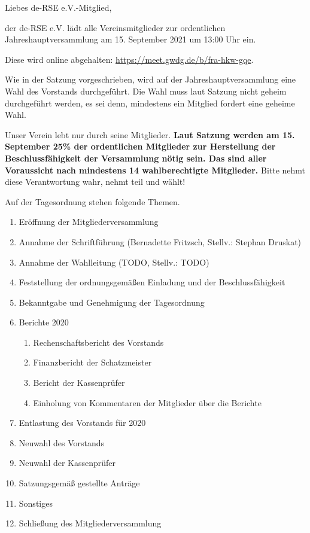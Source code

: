 \documentclass[../Vorlagen/de-RSE_Brief,a4paper]{scrlttr2}
\begin{document}

\begin{letter}{\mbox{}
}
\opening{Liebes de-RSE e.V.-Mitglied,}

der de-RSE e.V. lädt alle Vereinsmitglieder zur ordentlichen Jahreshauptversammlung am 15. September 2021 um 13:00 Uhr ein.

Diese wird online abgehalten: \href{https://meet.gwdg.de/b/fra-hkw-gqe}{https://meet.gwdg.de/b/fra-hkw-gqe}.

Wie in der Satzung vorgeschrieben, wird auf der Jahreshauptversammlung eine Wahl des Vorstands durchgeführt.
Die Wahl muss laut Satzung nicht geheim durchgeführt werden, es sei denn, mindestens ein Mitglied fordert eine geheime Wahl.

Unser Verein lebt nur durch seine Mitglieder.
\textbf{Laut Satzung werden am 15. September 25\% der ordentlichen Mitglieder zur Herstellung der Beschlussfähigkeit der Versammlung nötig sein. Das sind aller Voraussicht nach mindestens 14 wahlberechtigte Mitglieder.}
Bitte nehmt diese Verantwortung wahr, nehmt teil und wählt!

\clearpage
\vspace{2em}
Auf der Tagesordnung stehen folgende Themen.
\begin{enumerate}
\setlength\itemsep{0em}
\item Eröffnung der Mitgliederversammlung
\item Annahme der Schriftführung (Bernadette Fritzsch, Stellv.: Stephan Druskat)
\item Annahme der Wahlleitung (TODO, Stellv.: TODO)
\item Feststellung der ordnungsgemäßen Einladung und der Beschlussfähigkeit
\item Bekanntgabe und Genehmigung der Tagesordnung
\item Berichte 2020
\begin{enumerate}
 \item Rechenschaftsbericht des Vorstands
 \item Finanzbericht der Schatzmeister
 \item Bericht der Kassenprüfer
 \item Einholung von Kommentaren der Mitglieder über die Berichte
\end{enumerate}
\item Entlastung des Vorstands für 2020
\item Neuwahl des Vorstands
\item Neuwahl der Kassenprüfer
\item Satzungsgemäß gestellte Anträge
\item Sonstiges
\item Schließung des Mitgliederversammlung
\end{enumerate}


\end{letter}
\end{document}
